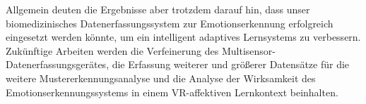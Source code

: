 Allgemein deuten die Ergebnisse aber trotzdem darauf hin, dass unser biomedizinisches Datenerfassungssystem zur Emotionserkennung erfolgreich eingesetzt werden k{\"o}nnte, um ein intelligent adaptives Lernsystems zu verbessern. 
Zuk{\"u}nftige Arbeiten werden die Verfeinerung des Multisensor-Datenerfassungsger{\"a}tes, die Erfassung weiterer und gr{\"o}{\ss}erer Datens{\"a}tze f{\"u}r die weitere Mustererkennungsanalyse und die Analyse der Wirksamkeit des Emotionserkennungssystems in einem VR-affektiven Lernkontext beinhalten.